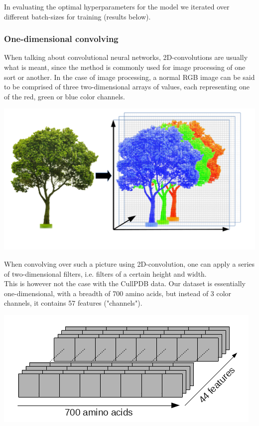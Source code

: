 \begin{multicols}{2}
In evaluating the optimal hyperparameters for the model we iterated over different batch-sizes for training (results below).

\subsubsection{One-dimensional convolving}
When talking about convolutional neural networks, 2D-convolutions are usually what is meant, since the method is commonly used for image processing of one sort or another. In the case of image processing, a normal RGB image can be said to be comprised of three two-dimensional arrays of values, each representing one of the red, green or blue color channels.
\begin{Figure}
 \centering
 \includegraphics[width=\linewidth]{../graphs/tree/full}
 \captionsetup{width=0.8\linewidth, font=small}
\end{Figure}
\noindent When convolving over such a picture using 2D-convolution, one can apply a series of two-dimensional filters, i.e. filters of a certain height and width.\\
This is however not the case with the CullPDB data. Our dataset is essentially one-dimensional, with a breadth of 700 amino acids, but instead of 3 color channels, it contains 57 features ("channels").
\begin{Figure}
 \centering
 \includegraphics[width=\linewidth]{../graphs/tree/amino}

\end{Figure}
\end{multicols}

